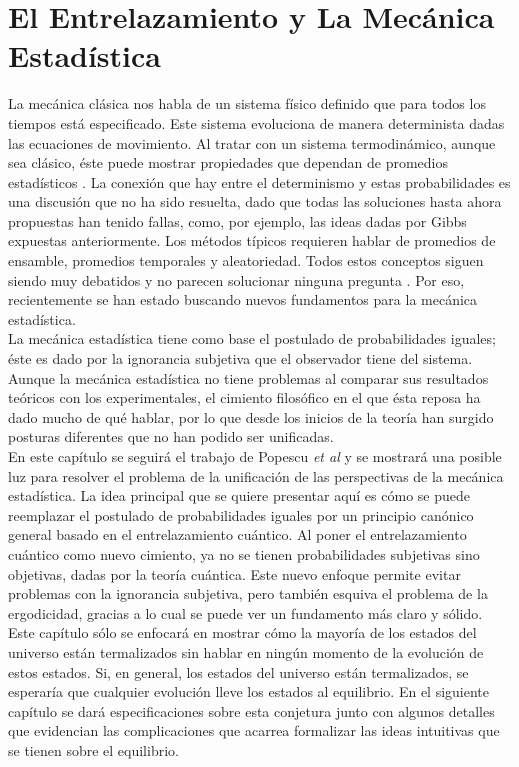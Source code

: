 \chapter{El Entrelazamiento y La Mecánica Estadística} \label{cap:2}

La mecánica clásica nos habla de un sistema físico definido que para todos los tiempos está especificado. Este sistema evoluciona de manera determinista dadas las ecuaciones de movimiento. Al tratar con un sistema termodinámico, aunque sea clásico, éste puede mostrar propiedades que dependan de promedios estadísticos \cite{CallenThermo}. La conexión que hay entre el determinismo y estas probabilidades es una discusión que no ha sido resuelta, dado que todas las soluciones hasta ahora propuestas han tenido fallas, como, por ejemplo, las ideas dadas por Gibbs expuestas anteriormente. Los métodos típicos requieren hablar de promedios de ensamble, promedios temporales y aleatoriedad. Todos estos conceptos siguen siendo muy debatidos y no parecen solucionar ninguna pregunta \cite{TodaStat}. Por eso, recientemente se han estado buscando nuevos fundamentos para la mecánica estadística.
\\
La mecánica estadística tiene como base el postulado de probabilidades iguales; éste es dado por la ignorancia subjetiva que el observador tiene del sistema. Aunque la mecánica estadística no tiene problemas al comparar sus resultados teóricos con los experimentales, el cimiento filosófico en el que ésta reposa ha dado mucho de qué hablar, por lo que desde los inicios de la teoría han surgido posturas diferentes que no han podido ser unificadas. 
\\
En este capítulo se seguirá el trabajo de Popescu \textit{et al}  \cite{Popescu2006} y se mostrará una posible luz para resolver el problema de la unificación de las perspectivas de la mecánica estadística. La idea principal que se quiere presentar aquí es cómo se puede reemplazar el postulado de probabilidades iguales por un principio canónico general basado en el entrelazamiento cuántico. Al poner el entrelazamiento cuántico como nuevo cimiento, ya no se tienen probabilidades subjetivas sino objetivas, dadas por la teoría cuántica. Este nuevo enfoque permite evitar problemas con la ignorancia subjetiva, pero también esquiva el problema de la ergodicidad, gracias a lo cual se puede ver un fundamento más claro y sólido. 
\\
Este capítulo sólo se enfocará en mostrar cómo la mayoría de los estados del universo están termalizados sin hablar en ningún momento de la evolución de estos estados. Si, en general, los estados del universo están termalizados, se esperaría que cualquier evolución lleve los estados al equilibrio. En el siguiente capítulo se dará especificaciones sobre esta conjetura junto con algunos detalles que evidencian las complicaciones que acarrea formalizar las ideas intuitivas que se tienen sobre el equilibrio.
\\
